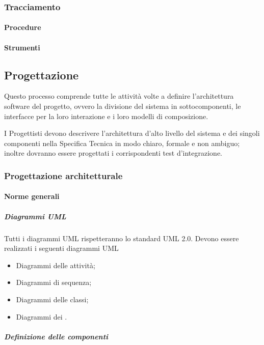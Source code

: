 \subsubsection{Tracciamento}

\paragraph{Procedure}


\paragraph{Strumenti}




\subsection{Progettazione}
Questo processo comprende tutte le attività volte a definire l'architettura software del progetto, ovvero la divisione del sistema in sottocomponenti, le interfacce per la loro interazione e i loro modelli di composizione. %


I Progettisti devono descrivere l'architettura d'alto livello del sistema e dei singoli componenti nella Specifica Tecnica in modo chiaro, formale e non ambiguo; inoltre dovranno essere progettati i corrispondenti test d'integrazione.



\subsubsection{Progettazione architetturale}
\paragraph{Norme generali}


\subparagraph{Diagrammi UML}

Tutti i diagrammi UML rispetteranno lo standard UML 2.0.
Devono essere realizzati i seguenti diagrammi UML
\begin{itemize}
\item Diagrammi delle attività;
\item Diagrammi di sequenza;
\item Diagrammi delle classi;
\item Diagrammi dei .
\end{itemize}

\subparagraph{Definizione delle componenti}

